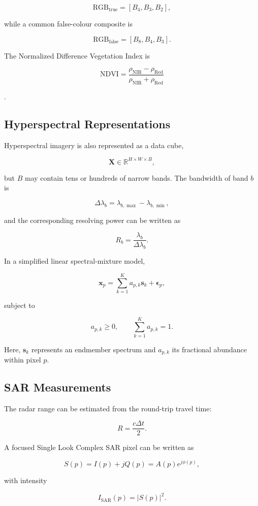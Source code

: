 \documentclass[
    11pt,
    a4paper,
    parskip=half,
    bibliography=totoc,
    numbers=noenddot
]{scrartcl}
\begin{document}
\[
\mathrm{RGB}_{\mathrm{true}}=[B_4,B_3,B_2],
\]

while a common false-colour composite is

\[
\mathrm{RGB}_{\mathrm{false}}=[B_8,B_4,B_3].
\]

The Normalized Difference Vegetation Index is

\[
\mathrm{NDVI}
=
\frac{\rho_{\mathrm{NIR}}-\rho_{\mathrm{Red}}}
     {\rho_{\mathrm{NIR}}+\rho_{\mathrm{Red}}}
\]

\cite{rouse1974monitoring}.

\subsection{Hyperspectral Representations}

Hyperspectral imagery is also represented as a data cube,

\[
\mathbf{X}\in\mathbb{R}^{H\times W\times B},
\]

but \(B\) may contain tens or hundreds of narrow bands. The bandwidth of
band \(b\) is

\[
\Delta\lambda_b =
\lambda_{b,\max}-\lambda_{b,\min},
\]

and the corresponding resolving power can be written as

\[
R_b=\frac{\lambda_b}{\Delta\lambda_b}.
\]

In a simplified linear spectral-mixture model,

\[
\mathbf{x}_p
=
\sum_{k=1}^{K}a_{p,k}\mathbf{s}_k
+
\boldsymbol{\epsilon}_p,
\]

subject to

\[
a_{p,k}\geq0,
\qquad
\sum_{k=1}^{K}a_{p,k}=1.
\]

Here, \(\mathbf{s}_k\) represents an endmember spectrum and \(a_{p,k}\)
its fractional abundance within pixel \(p\).

\subsection{SAR Measurements}

The radar range can be estimated from the round-trip travel time:

\[
R=\frac{c\Delta t}{2}.
\]

A focused Single Look Complex SAR pixel can be written as

\[
S(p)=I(p)+jQ(p)=A(p)e^{j\phi(p)},
\]

with intensity

\[
I_{\mathrm{SAR}}(p)=|S(p)|^2.
\]
\end{document}

